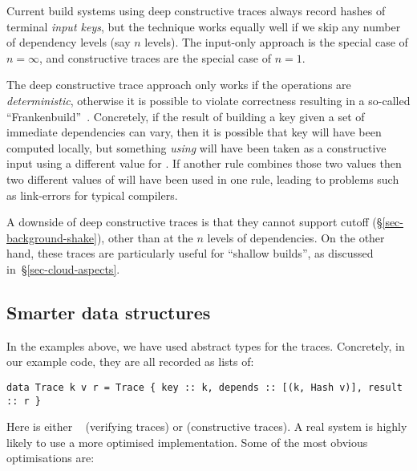 Current build systems using deep constructive traces always record hashes of
terminal \emph{input keys}, but the technique works equally well if we skip any
number of dependency levels (say $n$ levels). The input-only approach is the
special case of $n = \infty$, and constructive traces are the special case of
$n = 1$.

The deep constructive trace approach only works if the operations are
\emph{deterministic}, otherwise it is possible to violate correctness resulting
in a so-called ``Frankenbuild''~\cite{esfahani2016cloudbuild}. Concretely, if
the result of building a key given a set of immediate dependencies can vary,
then it is possible that key  will have been computed locally, but
something \emph{using}  will have been taken as a constructive input using
a different value for . If another rule combines those two values then two
different values of  will have been used in one rule, leading to problems
such as link-errors for typical compilers.

A downside of deep constructive traces is that they cannot support cutoff
(\S\ref{sec-background-shake}), other than at the $n$ levels of dependencies. On
the other hand, these traces are particularly useful for ``shallow builds'', as
discussed in~\S\ref{sec-cloud-aspects}.

\subsection{Smarter \hs{[Trace]} data structures}\label{sec-smart-traces}

In the examples above, we have used abstract types for the traces. Concretely, in our example code, they are all recorded as lists of:

\begin{verbatim}
data Trace k v r = Trace { key :: k, depends :: [(k, Hash v)], result :: r }
\end{verbatim}

\noindent
Here  is either ~ (verifying traces) or
 (constructive traces). A real system is highly likely to use a more
optimised implementation. Some of the most obvious optimisations are:

